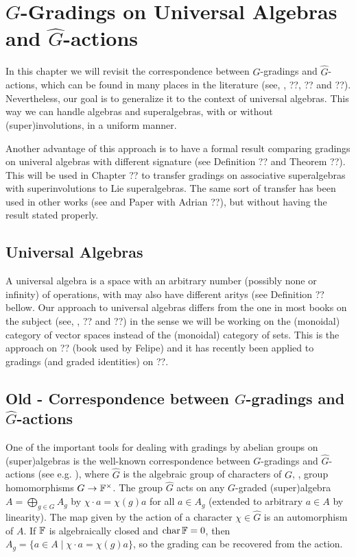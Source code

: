\chapter{$G$-Gradings on Universal Algebras and $\widehat G$-actions}

In this chapter we will revisit the correspondence between $G$-gradings and $\widehat G$-actions, which can be found in many places in the literature (see, \eg, ??, ?? and ??). 
Nevertheless, our goal is to generalize it to the context of universal algebras. 
This way we can handle algebras and superalgebras, with or without (super)involutions, in a uniform manner. 

Another advantage of this approach is to have a formal result comparing gradings on univeral algebras with different signature (see Definition ?? and Theorem ??). 
This will be used in Chapter ?? to transfer gradings on associative superalgebras with superinvolutions to Lie superalgebras. 
The same sort of transfer has been used in other works (see \cite{livromicha} and Paper with Adrian ??), but without having the result stated properly. 

\section{Universal Algebras}

A universal algebra is a space with an arbitrary number (possibly none or infinity) of operations, with may also have different aritys (see Definition ?? bellow. 
Our approach to universal algebras differs from the one in most books on the subject (see, \eg, ?? and ??) in the sense we will be working on the (monoidal) category of vector spaces instead of the (monoidal) category of sets. 
This is the approach on ?? (book used by Felipe) and it has recently been applied to gradings (and graded identities) on ??.


\section{Old - Correspondence between $G$-gradings and\\ $\widehat G$-actions}\label{ssec:G-hat-action}

One of the important tools for dealing with gradings by abelian groups on (super)algebras is the well-known correspondence between  $G$-gradings and $\widehat G$-actions (see e.g. \cite[\S 1.4]{livromicha}), where $\widehat G$ is the algebraic group of characters of $G$, \ie, group homomorphisms $G \rightarrow \mathbb{F}^{\times}$. The group $\widehat{G}$ acts on any $G$-graded (super)algebra $A = \bigoplus_{g\in G} A_g$ by $\chi \cdot a = \chi(g) a$ for all $a\in A_g$ (extended to arbitrary $a\in A$ by linearity). The map given by the action of a character $\chi \in \widehat{G}$ is an automorphism of $A$. If $\mathbb{F}$ is algebraically closed and $\operatorname{char} \mathbb{F} = 0$, then $A_g = \{ a\in A \mid \chi \cdot a = \chi (g) a\}$, so the grading can be recovered from the action.

